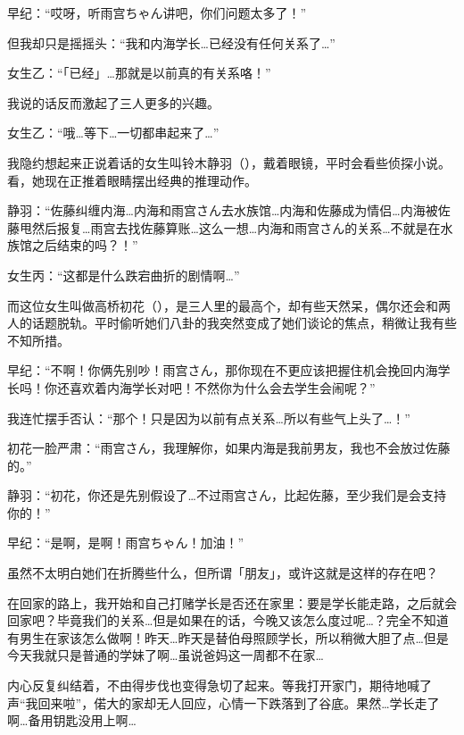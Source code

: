 早纪：“哎呀，听雨宫ちゃん讲吧，你们问题太多了！”

但我却只是摇摇头：“我和内海学长…已经没有任何关系了…”

女生乙：“「已经」…那就是以前真的有关系咯！”

我说的话反而激起了三人更多的兴趣。

女生乙：“哦…等下…一切都串起来了…”

我隐约想起来正说着话的女生叫铃木静羽（），戴着眼镜，平时会看些侦探小说。看，她现在正推着眼睛摆出经典的推理动作。

静羽：“佐藤纠缠内海…内海和雨宫さん去水族馆…内海和佐藤成为情侣…内海被佐藤甩然后报复…雨宫去找佐藤算账…这么一想…内海和雨宫さん的关系…不就是在水族馆之后结束的吗？！”

女生丙：“这都是什么跌宕曲折的剧情啊…”

而这位女生叫做高桥初花（），是三人里的最高个，却有些天然呆，偶尔还会和两人的话题脱轨。平时偷听她们八卦的我突然变成了她们谈论的焦点，稍微让我有些不知所措。


早纪：“不啊！你俩先别吵！雨宫さん，那你现在不更应该把握住机会挽回内海学长吗！你还喜欢着内海学长对吧！不然你为什么会去学生会闹呢？”

我连忙摆手否认：“那个！只是因为以前有点关系…所以有些气上头了…！”

初花一脸严肃：“雨宫さん，我理解你，如果内海是我前男友，我也不会放过佐藤的。”

静羽：“初花，你还是先别假设了…不过雨宫さん，比起佐藤，至少我们是会支持你的！”

早纪：“是啊，是啊！雨宫ちゃん！加油！”

虽然不太明白她们在折腾些什么，但所谓「朋友」，或许这就是这样的存在吧？

\cutlinef\timepast

\newday{\sunny\sunset}

在回家的路上，我开始和自己打赌学长是否还在家里：要是学长能走路，之后就会回家吧？毕竟我们的关系…但是如果在的话，今晚又该怎么度过呢…？完全不知道有男生在家该怎么做啊！昨天…昨天是替伯母照顾学长，所以稍微大胆了点…但是今天我就只是普通的学妹了啊…虽说爸妈这一周都不在家…

内心反复纠结着，不由得步伐也变得急切了起来。等我打开家门，期待地喊了声“我回来啦”，偌大的家却无人回应，心情一下跌落到了谷底。果然…学长走了啊…备用钥匙没用上啊…

